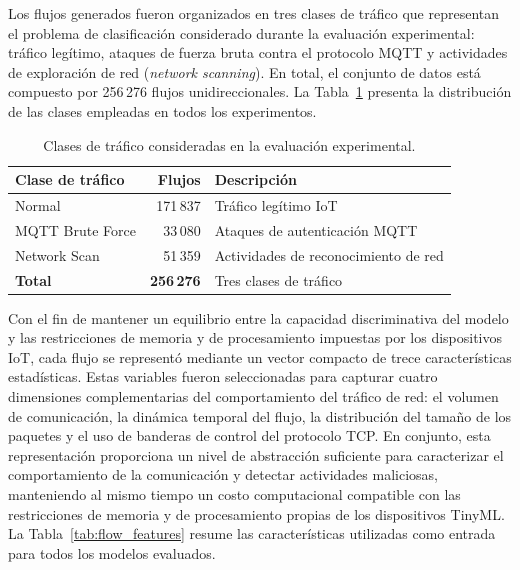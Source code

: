 \documentclass[journal,article,submit,moreauthors]{Definitions/mdpi}
\begin{document}
Los flujos generados fueron organizados en tres clases de tráfico que representan el problema de clasificación considerado durante la evaluación experimental: tráfico legítimo, ataques de fuerza bruta contra el protocolo MQTT y actividades de exploración de red (\textit{network scanning}). En total, el conjunto de datos está compuesto por 256\,276 flujos unidireccionales. La Tabla~\ref{tab:dataset_composition} presenta la distribución de las clases empleadas en todos los experimentos.

\begin{table}[ht]
\centering
\caption{Clases de tráfico consideradas en la evaluación experimental.}
\label{tab:dataset_composition}
\footnotesize
\begin{tabular}{lrl}
\toprule
\textbf{Clase de tráfico} & \textbf{Flujos} & \textbf{Descripción} \\
\midrule
Normal & 171\,837 & Tráfico legítimo IoT \\
MQTT Brute Force & 33\,080 & Ataques de autenticación MQTT \\
Network Scan & 51\,359 & Actividades de reconocimiento de red \\
\midrule
\textbf{Total} & \textbf{256\,276} & Tres clases de tráfico \\
\bottomrule
\end{tabular}
\end{table}

Con el fin de mantener un equilibrio entre la capacidad discriminativa del modelo y las restricciones de memoria y de procesamiento impuestas por los dispositivos IoT, cada flujo se representó mediante un vector compacto de trece características estadísticas. Estas variables fueron seleccionadas para capturar cuatro dimensiones complementarias del comportamiento del tráfico de red: el volumen de comunicación, la dinámica temporal del flujo, la distribución del tamaño de los paquetes y el uso de banderas de control del protocolo TCP. En conjunto, esta representación proporciona un nivel de abstracción suficiente para caracterizar el comportamiento de la comunicación y detectar actividades maliciosas, manteniendo al mismo tiempo un costo computacional compatible con las restricciones de memoria y de procesamiento propias de los dispositivos TinyML. La Tabla~\ref{tab:flow_features} resume las características utilizadas como entrada para todos los modelos evaluados.
\end{document}
